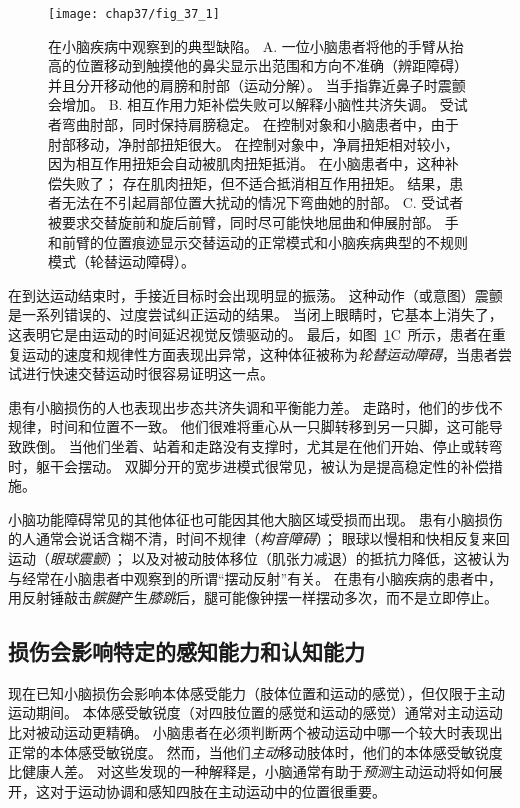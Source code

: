 \begin{figure}[htbp]
	\centering
	\texttt{[image: chap37/fig\_37\_1]}
	\caption{在小脑疾病中观察到的典型缺陷。
		A. 一位小脑患者将他的手臂从抬高的位置移动到触摸他的鼻尖显示出范围和方向不准确（辨距障碍）并且分开移动他的肩膀和肘部（运动分解）。 
		当手指靠近鼻子时震颤会增加。
		B. 相互作用力矩补偿失败可以解释小脑性共济失调。
		受试者弯曲肘部，同时保持肩膀稳定。
		在控制对象和小脑患者中，由于肘部移动，净肘部扭矩很大。
		在控制对象中，净肩扭矩相对较小，因为相互作用扭矩会自动被肌肉扭矩抵消。
		在小脑患者中，这种补偿失败了；
		存在肌肉扭矩，但不适合抵消相互作用扭矩。
		结果，患者无法在不引起肩部位置大扰动的情况下弯曲她的肘部\cite{bastian2000cerebellar}。
		C. 受试者被要求交替旋前和旋后前臂，同时尽可能快地屈曲和伸展肘部。
		手和前臂的位置痕迹显示交替运动的正常模式和小脑疾病典型的不规则模式（轮替运动障碍）。}
	\label{fig:37_1}
\end{figure}


在到达运动结束时，手接近目标时会出现明显的振荡。
这种动作（或意图）震颤是一系列错误的、过度尝试纠正运动的结果。
当闭上眼睛时，它基本上消失了，这表明它是由运动的时间延迟视觉反馈驱动的。
最后，如图~\ref{fig:37_1}C~所示，患者在重复运动的速度和规律性方面表现出异常，这种体征被称为\textit{轮替运动障碍}，当患者尝试进行快速交替运动时很容易证明这一点。


患有小脑损伤的人也表现出步态共济失调和平衡能力差。
走路时，他们的步伐不规律，时间和位置不一致。
他们很难将重心从一只脚转移到另一只脚，这可能导致跌倒。
当他们坐着、站着和走路没有支撑时，尤其是在他们开始、停止或转弯时，躯干会摆动。
双脚分开的宽步进模式很常见，被认为是提高稳定性的补偿措施。


小脑功能障碍常见的其他体征也可能因其他大脑区域受损而出现。
患有小脑损伤的人通常会说话含糊不清，时间不规律（\textit{构音障碍}）；
眼球以慢相和快相反复来回运动（\textit{眼球震颤}）；
以及对被动肢体移位（肌张力减退）的抵抗力降低，这被认为与经常在小脑患者中观察到的所谓“摆动反射”有关。
在患有小脑疾病的患者中，用反射锤敲击\textit{髌腱}产生\textit{膝跳}后，腿可能像钟摆一样摆动多次，而不是立即停止。



\subsection{损伤会影响特定的感知能力和认知能力}

现在已知小脑损伤会影响本体感受能力（肢体位置和运动的感觉），但仅限于主动运动期间。
本体感受敏锐度（对四肢位置的感觉和运动的感觉）通常对主动运动比对被动运动更精确。
小脑患者在必须判断两个被动运动中哪一个较大时表现出正常的本体感受敏锐度。
然而，当他们\textit{主动}移动肢体时，他们的本体感受敏锐度比健康人差。
对这些发现的一种解释是，小脑通常有助于\textit{预测}主动运动将如何展开，这对于运动协调和感知四肢在主动运动中的位置很重要。


